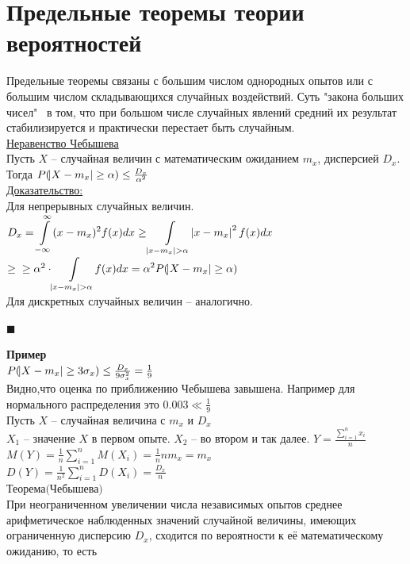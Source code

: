 \documentclass[russian, 12pt, fleqn]{article}
\begin{document}
\section{Предельные теоремы теории вероятностей}
\noindent
Предельные теоремы связаны с большим числом однородных опытов или с большим числом складывающихся случайных воздействий. Суть "закона больших чисел"  \ в том, что при большом числе случайных явлений средний их результат стабилизируется и практически перестает быть случайным.\\
\underline{Неравенство Чебышева}\\
Пусть $X$ -- случайная величин с математическим ожиданием $m_x$, дисперсией $D_x$.\\
Тогда $P(\abs{X - m_x} \geq \alpha) \leq \frac{D_x}{\alpha^2}$\\
\underline{Доказательство:}\\
Для непрерывных случайных величин. \\
$D_x =  \displaystyle{\int\limits_{-\infty}^{\infty} }(x-m_x)^2 f(x) dx \geq \displaystyle{\int\limits_{\abs{x - m_x} > \alpha} } \abs{x-m_x}^2 f(x) dx$
$\geq  \\ \geq \alpha^2  \cdot \displaystyle{\int\limits_{\abs{x - m_x} > \alpha} }f(x) dx = \alpha^2 P(\abs{X - m_x} \geq \alpha)$ \\
Для дискретных случайных величин -- аналогично.\\
\begin{flushright}\(\blacksquare\)\end{flushright}
\textbf{Пример} \\
$P(\abs{X - m_x} \geq  3 \sigma_x) \leq  \frac{D_x}{9\sigma_x^2} = \frac{1}{9}$\\
Видно,что оценка по  приближению Чебышева  завышена.  Например для нормального распределения это $0.003 \ll \frac{1}{9}$\\
Пусть $X$ -- случайная величина с $m_x$  и $D_x$\\
$X_1$ -- значение $X$ в первом опыте. $X_2$ -- во втором и так далее. $Y = \frac{\displaystyle{\sum\limits_{i = 1}  ^ {n} x_i}}{n}$ $M(Y) = \frac{1}{n} \displaystyle{\sum\limits_{i = 1}^{n}} M(X_i) = \frac{1}{n} n m_x = m_x$\\
$D(Y)  = \frac{1}{n^2}\displaystyle{\sum\limits_{i = 1}^{n}} D(X_i) = \frac{D_x}{n}$\\
$\textbf{Теорема(Чебышева)}$\\
При неограниченном увеличении числа независимых опытов  среднее \\ арифметическое наблюденных значений случайной величины, имеющих ограниченную дисперсию $D_x$, сходится по вероятности к её математическому ожиданию, то есть
\end{document}
